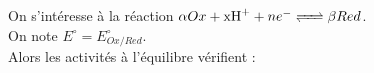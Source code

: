 ﻿\documentclass[a4paper]{article}
\begin{document}
\pagestyle{fancy}
\fancyhf{}
\setlength{\headheight}{15pt}

\begin{center}
	\large{}
\end{center}


On s'intéresse à la réaction \(\alpha Ox +\ce{xH+}+ne^-\ce{<=>}\beta Red\).\\
On note \(E^{\circ}=E_{Ox/Red}^{\circ}\).\\
Alors les activités à l'équilibre vérifient :
\begin{center}
\end{center}
\end{document}
